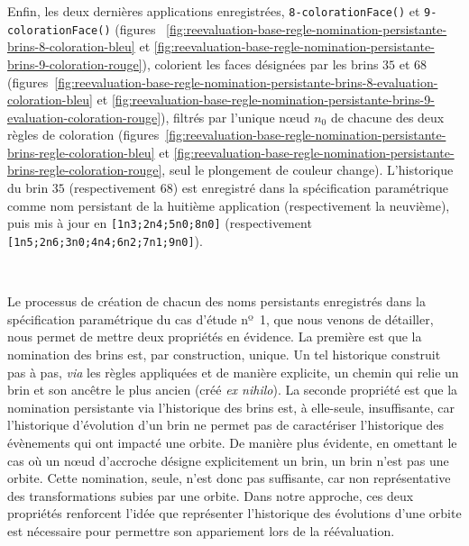 Enfin, les deux dernières applications enregistrées,
\texttt{8-\allowbreak{}coloration\-Face()}
et
\texttt{9-\allowbreak{}coloration\-Face()}
(figures
~\ref{fig:reevaluation-base-regle-nomination-persistante-brins-8-coloration-bleu}
et
\ref{fig:reevaluation-base-regle-nomination-persistante-brins-9-coloration-rouge}\allowbreak{}),
colorient les faces désignées par les brins \(35\) et \(68\)
(figures~\ref{fig:reevaluation-base-regle-nomination-persistante-brins-8-evaluation-coloration-bleu}
et
\ref{fig:reevaluation-base-regle-nomination-persistante-brins-9-evaluation-coloration-rouge}),
filtrés par l'unique n\oe ud \(n_{0}\) de chacune des deux règles de coloration
(figures~\ref{fig:reevaluation-base-regle-nomination-persistante-brins-regle-coloration-bleu}
et
\ref{fig:reevaluation-base-regle-nomination-persistante-brins-regle-coloration-rouge},
seul le plongement de couleur change). %
L'historique du brin \(35\) (respectivement \(68\)) est enregistré dans la
spécification paramétrique comme nom persistant de la huitième application
(respectivement la neuvième), puis mis à jour en
\texttt{[1n3;\allowbreak{}2n4;\allowbreak{}5n0;\allowbreak{}8n0]}
(respectivement
\texttt{[1n5;\allowbreak{}2n6;\allowbreak{}3n0;\allowbreak{}4n4;\allowbreak{}6n2;\allowbreak{}7n1;\allowbreak{}9n0]}). %

~

Le processus de création de chacun des noms persistants enregistrés dans la
spécification paramétrique du cas d'étude nº~1, que nous venons de détailler,
nous permet de mettre deux propriétés en évidence. %
La première est que la nomination des brins est, par construction, unique. %
Un tel historique construit pas à pas, \textit{via} les règles appliquées et de
manière explicite, un chemin qui relie un brin et son ancêtre le plus ancien
(créé \textit{ex nihilo}). %
La seconde propriété est que la nomination persistante via l'historique des
brins est, à elle-seule, insuffisante, car l'historique d'évolution d'un brin ne
permet pas de caractériser l'historique des évènements qui ont impacté une
orbite. %
De manière plus évidente, en omettant le cas où un n\oe ud d'accroche désigne
explicitement un brin, un brin n'est pas une orbite. %
Cette nomination, seule, n'est donc pas suffisante, car non représentative des
transformations subies par une orbite. %
Dans notre approche, ces deux propriétés renforcent l'idée que représenter
l'historique des évolutions d'une orbite est nécessaire pour permettre son
appariement lors de la réévaluation. %




